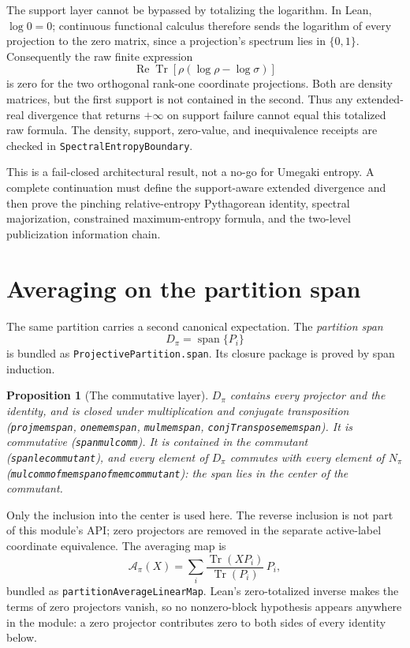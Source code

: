 \documentclass[11pt]{article}
\renewcommand{\_}{\textunderscore\allowbreak}
\newtheorem{proposition}{Proposition}
\theoremstyle{remark}
\newcommand{\Tr}{\operatorname{Tr}}
\newcommand{\avg}{\mathcal A}
\begin{document}
The support layer cannot be bypassed by totalizing the logarithm. In Lean,
\(\log 0=0\); continuous functional calculus therefore sends the logarithm
of every projection to the zero matrix, since a projection's spectrum lies
in \(\{0,1\}\). Consequently the raw finite expression
\[
 \operatorname{Re}\Tr\!\left[\rho(\log\rho-\log\sigma)\right]
\]
is zero for the two orthogonal rank-one coordinate projections. Both are
density matrices, but the first support is not contained in the second.
Thus any extended-real divergence that returns \(+\infty\) on support failure
cannot equal this totalized raw formula. The density, support, zero-value, and
inequivalence receipts are checked in
\texttt{SpectralEntropyBoundary}.

This is a fail-closed architectural result, not a no-go for Umegaki entropy.
A complete continuation must define the support-aware extended divergence and
then prove the pinching relative-entropy Pythagorean identity, spectral
majorization, constrained maximum-entropy formula, and the two-level
publicization information chain.

\section{Averaging on the partition span}
\label{sec:average}

The same partition carries a second canonical expectation. The
\emph{partition span}
\[
 D_\pi=\operatorname{span}\{P_i\}
\]
is bundled as \texttt{ProjectivePartition.span}. Its closure package is
proved by span induction.

\begin{proposition}[The commutative layer]
\label{prop:span}
$D_\pi$ contains every projector and the identity, and is closed under
multiplication and conjugate transposition
(\texttt{proj\_mem\_span}, \texttt{one\_mem\_span},
\texttt{mul\_mem\_span}, \texttt{conjTranspose\_mem\_span}). It is
commutative (\texttt{span\_mul\_comm}). It is contained in the commutant
(\texttt{span\_le\_commutant}), and every element of $D_\pi$ commutes with
every element of $N_\pi$
(\texttt{mul\_comm\_of\_mem\_span\_of\_mem\_commutant}): the span lies in the
center of the commutant.
\end{proposition}

Only the inclusion into the center is used here. The reverse inclusion is not
part of this module's API; zero projectors are removed in the separate active-label
coordinate equivalence. The averaging map is
\[
 \avg_\pi(X)=\sum_i\frac{\Tr(XP_i)}{\Tr(P_i)}\,P_i,
\]
bundled as \texttt{partitionAverageLinearMap}. Lean's zero-totalized inverse
makes the terms of zero projectors vanish, so no nonzero-block hypothesis
appears anywhere in the module: a zero projector contributes zero to both
sides of every identity below.
\end{document}
